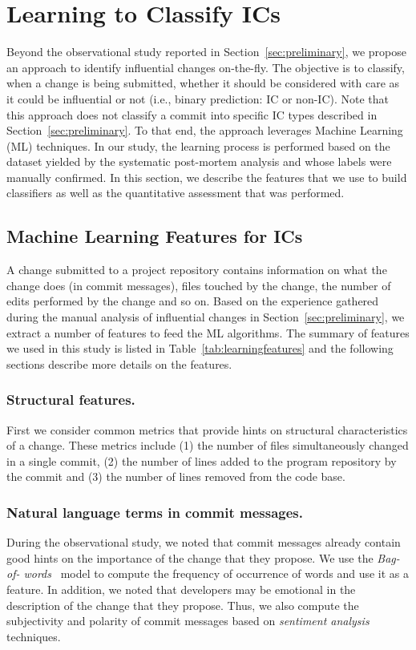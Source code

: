 \section{Learning to Classify IC{\scriptsize s}}
\label{sec:model}

Beyond the observational study reported in Section~\ref{sec:preliminary}, we
propose an approach to identify influential changes on-the-fly. The objective
is to classify, when a change is being submitted, whether it should be
considered with care as it could be influential or not (i.e., binary prediction: IC or non-IC). Note that this approach does not classify a commit into specific IC types described in Section~\ref{sec:preliminary}.
To that end, the approach
leverages Machine Learning (ML) techniques. In our study, the learning process
is performed based on the dataset yielded by the systematic post-mortem
analysis and whose labels were manually confirmed. In this section, we describe
the features that we use to build classifiers as well as the quantitative
assessment that was performed.

\subsection{Machine Learning Features for ICs}

A change submitted to a project repository contains information on what the
change does (in commit messages), files touched by the change, the number of
edits performed by the change and so on. Based on the experience gathered
during the manual analysis of influential changes in
Section~\ref{sec:preliminary}, we extract a number of features to feed the ML
algorithms. The summary of features we used in this study is listed in Table~\ref{tab:learningfeatures} and the following sections describe more details on the features.




\subsubsection{Structural features.}
First we consider common metrics that provide hints on structural
characteristics of a change.
These metrics include (1) the number of files simultaneously changed in a single
commit, (2) the number of lines added to the program repository by the 
commit and (3) the number of lines removed from the code base.


\subsubsection{Natural language terms in commit messages.} During the
observational study, we noted that commit messages already contain good hints
on the importance of the change that they propose. We use the {\it Bag-of-
words}~\cite{lewis:ecml:1998} model to compute the frequency of occurrence of
words and use it as a feature. In addition, we noted that developers may be
emotional in the description of the change that they propose. Thus, we also
compute the subjectivity and polarity of commit messages based on {\em
sentiment analysis}~\cite{hu_opinion_2006,ohana_opinion_2009,
liu_sentiment_2010,thelwall_sentiment_2010} techniques.

